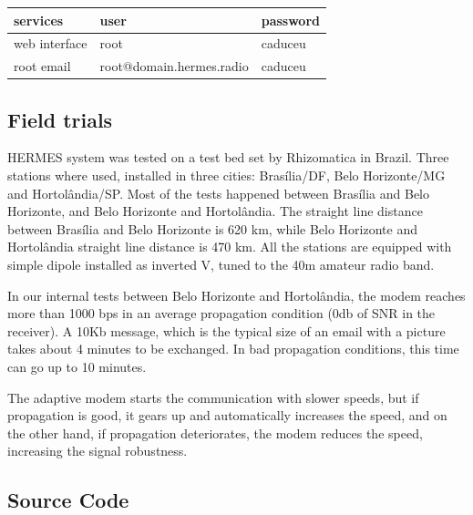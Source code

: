 \documentclass[11pt,a4paper]{article}
\begin{document}
\begin{table}[]
\centering
\begin{tabular}{|l|l|l|}
\hline
services      & user                     & password \\ \hline
web interface & root                     & caduceu  \\ \hline
root email    & root@domain.hermes.radio & caduceu  \\ \hline
\end{tabular}
\end{table}

\subsection{Field trials}
\label{apx_field_trials}
    HERMES system was tested on a test bed set by Rhizomatica in Brazil. Three stations where used, installed in three cities: Brasília/DF, Belo Horizonte/MG and Hortolândia/SP. Most of the tests happened between Brasília and Belo Horizonte, and Belo Horizonte and Hortolândia. The straight line distance between Brasília and Belo Horizonte is 620 km, while Belo Horizonte and Hortolândia straight line distance is 470 km. All the stations are equipped with simple dipole installed as inverted V, tuned to the 40m amateur radio band.

    In our internal tests between Belo Horizonte and Hortolândia, the modem reaches more than 1000 bps in an average propagation condition (0db of SNR in the receiver). A 10Kb message, which is the typical size of an email with a picture takes about 4 minutes to be exchanged. In bad propagation conditions, this time can go up to 10 minutes. 

    The adaptive modem starts the communication with slower speeds, but if propagation is good, it gears up and automatically increases the speed, and on the other hand, if propagation deteriorates, the modem reduces the speed, increasing the signal robustness.

\subsection{Source Code}
\label{apx_src}
\end{document}
